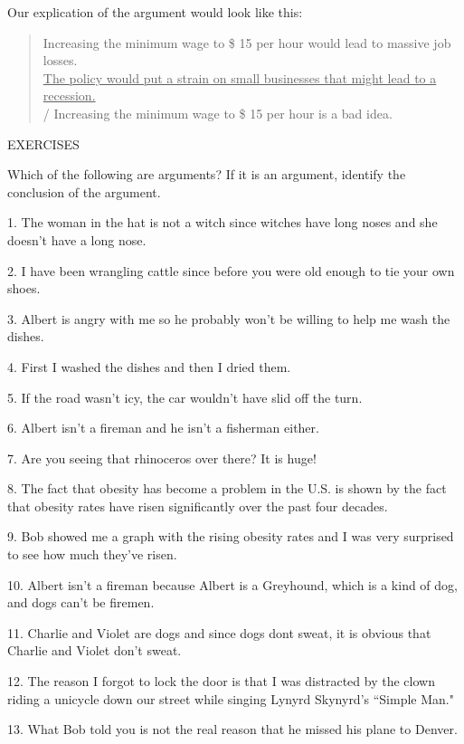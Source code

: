 Our explication of the argument would look like this:

\begin{quotation}
Increasing the minimum wage to \$ 15 per hour would lead to massive job losses. \\
\underline{The policy would put a strain on small businesses that might lead to a recession.} \\
/ Increasing the minimum wage to \$ 15 per hour is a bad idea. \\
\end{quotation}

EXERCISES

Which of the following are arguments?           
If it is an argument,
identify the conclusion of the argument.

1. The woman in the hat is not a witch since witches have long noses and
    she doesn't have a long nose.

2. I have been wrangling cattle since before you were old enough to tie
    your own shoes.

3. Albert is angry with me so he probably won't be willing to help me wash
    the dishes.

4. First I washed the dishes and then I dried them.

5. If the road wasn't icy, the car wouldn't have slid off the turn.

6. Albert isn't a fireman and he isn't a fisherman either.

7. Are you seeing that rhinoceros over there? It is huge!

8. The fact that obesity has become a problem in the U.S. is shown by the
    fact that obesity rates have risen significantly over the past four decades.

9. Bob showed me a graph with the rising obesity rates and I was very
    surprised to see how much they've risen.

10. Albert isn't a fireman because Albert is a Greyhound, which is a kind of
    dog, and dogs can't be firemen.

11. Charlie and Violet are dogs and since dogs dont sweat, it is obvious that
    Charlie and Violet don't sweat.

12. The reason I forgot to lock the door is that I was distracted by the clown
    riding a unicycle down our street while singing Lynyrd Skynyrd's ``Simple
    Man."

13. What Bob told you is not the real reason that he missed his plane to
    Denver.

